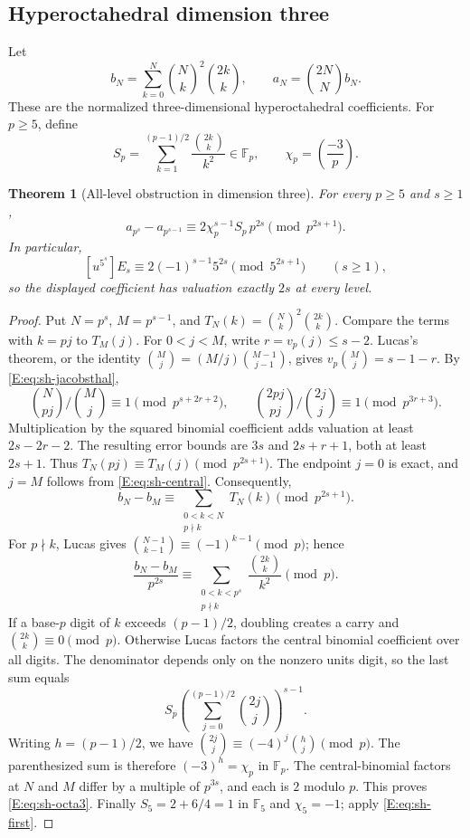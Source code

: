 \documentclass[11pt,a4paper]{article}
\newtheorem{theorem}{Theorem}[section]
\theoremstyle{definition}\newtheorem{definition}[theorem]{Definition}
\theoremstyle{remark}\newtheorem{remark}[theorem]{Remark}
\numberwithin{equation}{section}
\begin{document}
\subsection{Hyperoctahedral dimension three}

Let
\[
 b_N=\sum_{k=0}^N\binom Nk^2\binom{2k}{k},\qquad
 a_N=\binom{2N}{N}b_N.
\]
These are the normalized three-dimensional hyperoctahedral
coefficients.  For $p\geq5$, define
\[
 S_p=\sum_{k=1}^{(p-1)/2}\frac{\binom{2k}{k}}{k^2}\in\mathbb F_p,
 \qquad \chi_p=\left(\frac{-3}{p}\right).
\]

\begin{theorem}[All-level obstruction in dimension three]
\label{E:thm:sh-octa3}
For every $p\geq5$ and $s\geq1$,
\begin{equation}\label{E:eq:sh-octa3}
 a_{p^s}-a_{p^{s-1}}
 \equiv2\chi_p^{s-1}S_p\,p^{2s}\pmod{p^{2s+1}}.
\end{equation}
In particular,
\[
 [u^{5^s}]E_s\equiv2(-1)^{s-1}5^{2s}\pmod{5^{2s+1}}
 \qquad(s\geq1),
\]
so the displayed coefficient has valuation exactly $2s$ at every level.
\end{theorem}
\begin{proof}
Put $N=p^s$, $M=p^{s-1}$, and
$T_N(k)=\binom Nk^2\binom{2k}{k}$.  Compare the terms with $k=pj$
to $T_M(j)$.  For $0<j<M$, write $r=v_p(j)\leq s-2$.
Lucas's theorem, or the identity
$\binom Mj=(M/j)\binom{M-1}{j-1}$, gives
$v_p\binom Mj=s-1-r$.
By \eqref{E:eq:sh-jacobsthal},
\[
 \binom N{pj}/\binom Mj\equiv1\pmod{p^{s+2r+2}},\qquad
 \binom{2pj}{pj}/\binom{2j}{j}\equiv1\pmod{p^{3r+3}}.
\]
Multiplication by the squared binomial coefficient adds valuation
at least $2s-2r-2$.  The resulting error bounds are $3s$ and
$2s+r+1$, both at least $2s+1$.  Thus
$T_N(pj)\equiv T_M(j)\pmod{p^{2s+1}}$.
The endpoint $j=0$ is exact, and $j=M$ follows from
\eqref{E:eq:sh-central}.  Consequently,
\[
 b_N-b_M\equiv
 \sum_{\substack{0<k<N\\p\nmid k}}T_N(k)\pmod{p^{2s+1}}.
\]
For $p\nmid k$, Lucas gives
$\binom{N-1}{k-1}\equiv(-1)^{k-1}\pmod p$; hence
\[
 \frac{b_N-b_M}{p^{2s}}
 \equiv\sum_{\substack{0<k<p^s\\p\nmid k}}
 \frac{\binom{2k}{k}}{k^2}\pmod p.
\]
If a base-$p$ digit of $k$ exceeds $(p-1)/2$, doubling creates a
carry and $\binom{2k}{k}\equiv0\pmod p$.  Otherwise Lucas factors
the central binomial coefficient over all digits.  The denominator
depends only on the nonzero units digit, so the last sum equals
\[
 S_p\left(\sum_{j=0}^{(p-1)/2}\binom{2j}{j}\right)^{s-1}.
\]
Writing $h=(p-1)/2$, we have
$\binom{2j}{j}\equiv(-4)^j\binom hj\pmod p$.
The parenthesized sum is therefore $(-3)^h=\chi_p$ in
$\mathbb F_p$.
The central-binomial factors at $N$ and $M$ differ by a multiple
of $p^{3s}$, and each is $2$ modulo $p$.  This proves
\eqref{E:eq:sh-octa3}.
Finally $S_5=2+6/4=1$ in $\mathbb F_5$ and $\chi_5=-1$;
apply \eqref{E:eq:sh-first}.
\end{proof}
\end{document}
